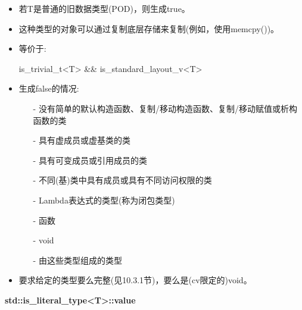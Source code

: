 \begin{itemize}
\item 
若T是普通的旧数据类型(POD)，则生成true。

\item 
这种类型的对象可以通过复制底层存储来复制(例如，使用memcpy())。

\item
等价于: 
\begin{cpp}
is_trivial_t<T> && is_standard_layout_v<T>
\end{cpp}

\item
生成false的情况:

\begin{itemize}
\item [-]
没有简单的默认构造函数、复制/移动构造函数、复制/移动赋值或析构函数的类

\item [-]
具有虚成员或虚基类的类

\item [-]
具有可变成员或引用成员的类

\item [-]
不同(基)类中具有成员或具有不同访问权限的类

\item [-]
Lambda表达式的类型(称为闭包类型)

\item [-]
函数

\item [-]
void

\item [-]
由这些类型组成的类型
\end{itemize}

\item
要求给定的类型要么完整(见10.3.1节)，要么是(cv限定的)void。
\end{itemize}

\textbf{std::is\_literal\_type<T>::value}

